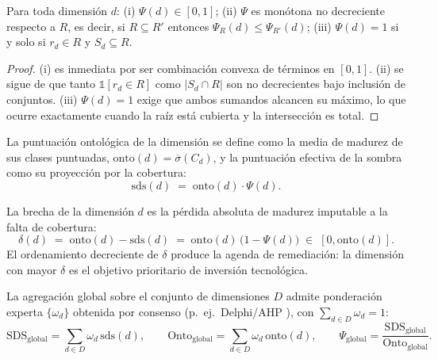 \documentclass[computers,article,submit,pdftex,moreauthors]{Definitions/mdpi}
\begin{document}
\begin{Proposition}
Para toda dimensión $d$: (i) $\Psi(d) \in [0,1]$; (ii) $\Psi$ es monótona no decreciente respecto a $R$, es decir, si $R \subseteq R'$ entonces $\Psi_R(d) \leq \Psi_{R'}(d)$; (iii) $\Psi(d) = 1$ si y solo si $r_d \in R$ y $S_d \subseteq R$.
\end{Proposition}

\begin{proof}
(i) es inmediata por ser combinación convexa de términos en $[0,1]$. (ii) se sigue de que tanto $\mathbb{1}[r_d \in R]$ como $\lvert S_d \cap R\rvert$ son no decrecientes bajo inclusión de conjuntos. (iii) $\Psi(d)=1$ exige que ambos sumandos alcancen su máximo, lo que ocurre exactamente cuando la raíz está cubierta y la intersección es total. \end{proof}

La puntuación ontológica de la dimensión se define como la media de madurez de sus clases puntuadas, $\mathrm{onto}(d) = \overline{\sigma}(C_d)$, y la puntuación efectiva de la sombra como su proyección por la cobertura:
\begin{equation}
\mathrm{sds}(d) \;=\; \mathrm{onto}(d) \cdot \Psi(d).
\label{eq:dtscore}
\end{equation}

\begin{Definition}
La brecha de la dimensión $d$ es la pérdida absoluta de madurez imputable a la falta de cobertura:
\begin{equation}
\delta(d) \;=\; \mathrm{onto}(d) - \mathrm{sds}(d) \;=\; \mathrm{onto}(d)\,\bigl(1 - \Psi(d)\bigr) \;\in\; [0, \mathrm{onto}(d)].
\label{eq:delta}
\end{equation}
El ordenamiento decreciente de $\delta$ produce la agenda de remediación: la dimensión con mayor $\delta$ es el objetivo prioritario de inversión tecnológica.
\end{Definition}

La agregación global sobre el conjunto de dimensiones $D$ admite ponderación experta $\{\omega_d\}$ obtenida por consenso (p.~ej.\ Delphi/AHP \cite{Saaty1990}), con $\sum_{d \in D} \omega_d = 1$:
\begin{equation}
\mathrm{SDS}_{\mathrm{global}} = \sum_{d \in D} \omega_d \, \mathrm{sds}(d), \qquad
\mathrm{Onto}_{\mathrm{global}} = \sum_{d \in D} \omega_d \, \mathrm{onto}(d), \qquad
\Psi_{\mathrm{global}} = \frac{\mathrm{SDS}_{\mathrm{global}}}{\mathrm{Onto}_{\mathrm{global}}}.
\label{eq:global}
\end{equation}
\end{document}
